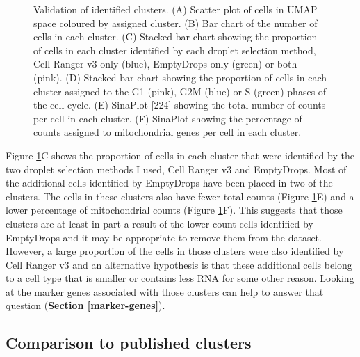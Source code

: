 \documentclass[11pt,a4paper,titlepage,twoside,openright]{style/unimelbthesis}
\theoremstyle{definition}
\theoremstyle{definition}
\theoremstyle{definition}
\theoremstyle{remark}
\begin{document}
\begin{mainmatter}
\begin{figure}
\caption[Validation of identified clusters.]{Validation of identified clusters. (A) Scatter plot of cells in UMAP space coloured by assigned cluster. (B) Bar chart of the number of cells in each cluster. (C) Stacked bar chart showing the proportion of cells in each cluster identified by each droplet selection method, Cell Ranger v3 only (blue), EmptyDrops only (green) or both (pink). (D) Stacked bar chart showing the proportion of cells in each cluster assigned to the G1 (pink), G2M (blue) or S (green) phases of the cell cycle. (E) SinaPlot {[}224{]} showing the total number of counts per cell in each cluster. (F) SinaPlot showing the percentage of counts assigned to mitochondrial genes per cell in each cluster.}\label{fig:cluster-validation}
\end{figure}





Figure \ref{fig:cluster-validation}C shows the proportion of cells in each cluster that were identified by the two droplet selection methods I used, Cell Ranger v3 and EmptyDrops. Most of the additional cells identified by EmptyDrops have been placed in two of the clusters. The cells in these clusters also have fewer total counts (Figure \ref{fig:cluster-validation}E) and a lower percentage of mitochondrial counts (Figure \ref{fig:cluster-validation}F). This suggests that those clusters are at least in part a result of the lower count cells identified by EmptyDrops and it may be appropriate to remove them from the dataset. However, a large proportion of the cells in those clusters were also identified by Cell Ranger v3 and an alternative hypothesis is that these additional cells belong to a cell type that is smaller or contains less RNA for some other reason. Looking at the marker genes associated with those clusters can help to answer that question (\textbf{Section \ref{marker-genes}}).

\hypertarget{comparison-to-published-clusters}{%
\subsection{Comparison to published clusters}\label{comparison-to-published-clusters}}


\end{mainmatter}
\end{document}
